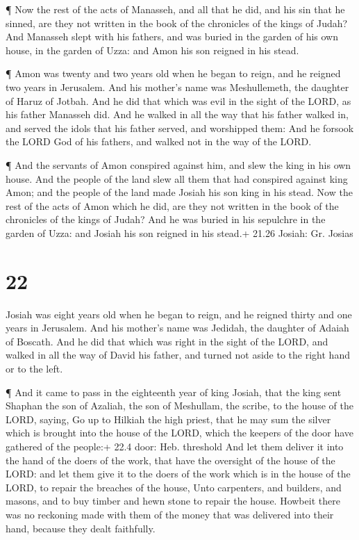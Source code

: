  ¶ Now the rest of the acts of Manasseh, and all that he
did, and his sin that he sinned, are they not written in the book of the
chronicles of the kings of Judah?  And Manasseh slept with
his fathers, and was buried in the garden of his own house, in the
garden of Uzza: and Amon his son reigned in his stead.

 ¶ Amon was twenty and two years old when he began to
reign, and he reigned two years in Jerusalem. And his mother's name was
Meshullemeth, the daughter of Haruz of Jotbah.  And he did
that which was evil in the sight of the LORD, as his father Manasseh
did.  And he walked in all the way that his father walked
in, and served the idols that his father served, and worshipped them:
 And he forsook the LORD God of his fathers, and walked not
in the way of the LORD.

 ¶ And the servants of Amon conspired against him, and slew
the king in his own house.  And the people of the land slew
all them that had conspired against king Amon; and the people of the
land made Josiah his son king in his stead.  Now the rest
of the acts of Amon which he did, are they not written in the book of
the chronicles of the kings of Judah?  And he was buried in
his sepulchre in the garden of Uzza: and Josiah his son reigned in his
stead.+ 21.26 Josiah: Gr. Josias

\hypertarget{section-21}{%
\section{22}\label{section-21}}

 Josiah was eight years old when he began to reign, and he
reigned thirty and one years in Jerusalem. And his mother's name was
Jedidah, the daughter of Adaiah of Boscath.  And he did that
which was right in the sight of the LORD, and walked in all the way of
David his father, and turned not aside to the right hand or to the left.

 ¶ And it came to pass in the eighteenth year of king
Josiah, that the king sent Shaphan the son of Azaliah, the son of
Meshullam, the scribe, to the house of the LORD, saying,  Go
up to Hilkiah the high priest, that he may sum the silver which is
brought into the house of the LORD, which the keepers of the door have
gathered of the people:+ 22.4 door: Heb. threshold  And let
them deliver it into the hand of the doers of the work, that have the
oversight of the house of the LORD: and let them give it to the doers of
the work which is in the house of the LORD, to repair the breaches of
the house,  Unto carpenters, and builders, and masons, and
to buy timber and hewn stone to repair the house.  Howbeit
there was no reckoning made with them of the money that was delivered
into their hand, because they dealt faithfully.

